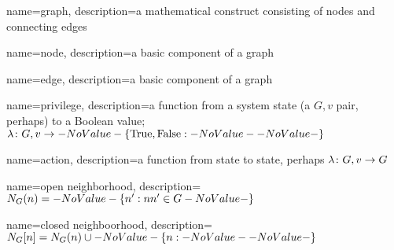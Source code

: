 
{
  name=graph,
  description={a mathematical construct consisting of nodes and connecting edges}
}

{
  name=node,
  description={a basic component of a graph}
}

{
  name=edge,
  description={a basic component of a graph}
}

{
  name=privilege,
  description={a function from a system state (a $G, v$ pair, perhaps) to a Boolean value; $\Function{G, v}{\SetBoolean}$}
}

{
  name=action,
  description={a function from state to state, perhaps $\Function{G, v}{G}$}
}




{
  name=open neighborhood,
  description={$\OpenNeighborhood{n}[G] = \Set{n^\prime}[nn^\prime \in G]$}
}

{
  name=closed neighboorhood,
  description={$\ClosedNeighborhood{n}[G] = \OpenNeighborhood{n}[G] \cup \Set{n}$}
}

